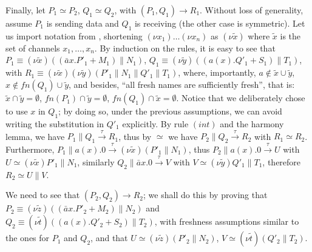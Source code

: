 \documentclass[orivec]{llncs}
\newcommand{\tr}[1]{\stackrel{#1}{\longrightarrow}}
\newcommand{\utr}{\to}
\newcommand{\sbe}{\simeq}
\newcommand{\fn}{\mathit{fn}}
\newcommand{\proend}{\medskip}
\renewenvironment{proof}{\begin{pro}}{\proend\end{pro}}
\begin{document}
\begin{proof}
 \medskip
 \noindent Finally, let $P_1 \sbe P_2$, $Q_1 \sbe Q_2$, with $(P_1,Q_1) \utr R_1$. Without loss of generality, assume $P_1$ is sending data and $Q_1$ is receiving (the other case is symmetric). Let us import notation from \cite{San01}, shortening $(\nu x_1) \ldots (\nu x_n)$ as $(\nu \tilde x)$ where $\tilde x$ is the set of channels $x_1,\ldots,x_n$. By induction on the rules, 
it is easy to see that $P_1 \equiv (\nu \tilde x) ((\bar a x. P'_1 + M_1) \parallel N_1)$, $Q_1 \equiv (\nu \tilde y) ((a(x).Q'_1 + S_1) \parallel T_1)$, with $R_1 \equiv (\nu \tilde x) (\nu \tilde y)(P'_1 \parallel N_1 \parallel Q'_1 \parallel T_1)$, where, importantly, $a \notin \tilde x \cup \tilde y$, $x \notin \fn(Q_1) \cup \tilde y$, and besides, ``all fresh names are sufficiently fresh'', that is: $\tilde x \cap \tilde y = \emptyset$, $\fn(P_1) \cap \tilde y = \emptyset$, $\fn(Q_1) \cap \tilde x = \emptyset$. Notice that we deliberately chose to use $x$ in $Q_1$; by doing so, under the previous assumptions, we can avoid writing the substitution in $Q'_1$ explicitly. By rule $(int)$ and the harmony lemma, we have $P_1 \parallel Q_1 \tr \tau R_1$, thus by $\sbe$ we have $P_2 \parallel Q_2 \tr \tau R_2$ with $R_1 \sbe R_2$. 
Furthermore, $P_1 \parallel a(x).0 \tr \tau (\nu \tilde x) (P'_1 \parallel N_1)$, thus $P_2 \parallel a(x).0 \tr \tau U$ with $U \sbe (\nu \tilde x) P'_1 \parallel N_1$, similarly $Q_2 \parallel \bar a x . 0 \tr \tau V$ with $V \sbe (\nu \tilde y)Q'_1 \parallel T_1$, therefore $R_2 \sbe U \parallel V$. 


 \newcommand{\ndownarrow}{/\hskip -7pt \downarrow}
 
 We need to see that $(P_2,Q_2) \utr R_2$; we shall do this by proving that $P_2 \equiv (\nu\tilde z)((\bar a x . P'_2 + M_2)\parallel N_2)$ and $Q_2 \equiv (\nu\tilde t) ((a(x).Q'_2+S_2)\parallel T_2)$, with freshness assumptions similar to the ones for $P_1$ and $Q_2$, and that $U \sbe (\nu\tilde z) (P'_2 \parallel N_2)$, $V \sbe (\nu \tilde t)(Q'_2 \parallel T_2)$. 
 

\end{proof}
\end{document}
